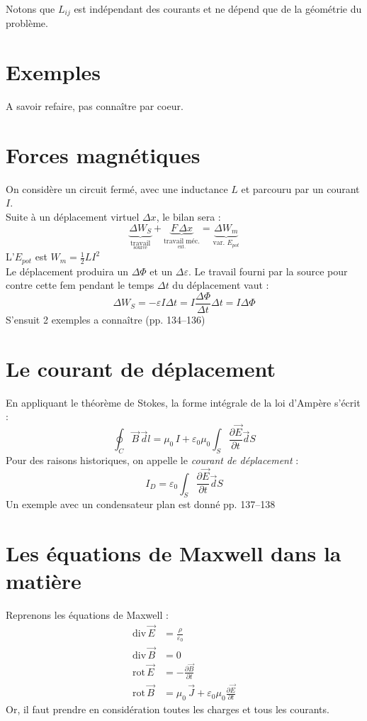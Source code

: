 \documentclass	[11pt, a4paper, openany]{book}
\newcommand{\rot}{\text{rot}\,}
\newcommand{\divv}{\text{div}\,}
\begin{document}
	Notons que $L_{ij}$ est indépendant des courants et ne dépend que de la géométrie du problème. 
	\section{Exemples}
	A savoir refaire, pas connaître par coeur.
	\section{Forces magnétiques}
	On considère un circuit fermé, avec une inductance $L$ et parcouru par un courant $I$.\\Suite à un déplacement virtuel $\Delta x$, le bilan sera : \begin{equation}
	\underbrace{\Delta W_S}_{\underset{\text{source}}{\text{travail}}}+\underbrace{F\,\Delta x}_{\underset{\text{ext.}}{\text{travail méc.}}}=\underbrace{\Delta W_m}_{\text{var. }E_{pot}}
	\end{equation}
	L'$E_{pot}$ est $W_m=\frac{1}{2}LI^2$\\ 
	Le déplacement produira un $\Delta\Phi$ et un $\Delta\varepsilon$. Le travail fourni par la source pour contre cette fem pendant le temps $\Delta t$ du déplacement vaut : \begin{equation}
	\Delta W_S=-\varepsilon I\Delta t=I\frac{\Delta\Phi}{\Delta t}\Delta t=I\Delta\Phi
	\end{equation}
	S'ensuit 2 exemples a connaître (pp. 134--136)
	\section{Le courant de déplacement}
	En appliquant le théorème de Stokes, la forme intégrale de la loi d'Ampère s'écrit :\begin{equation}
	\oint_C\vec B\,\vec dl=\mu_0\,I+\varepsilon_0\mu_0\int_S\frac{\partial\vec E}{\partial t}\vec dS
	\end{equation}
	Pour des raisons historiques, on appelle le \textit{courant de déplacement} :\begin{equation}
	I_D=\varepsilon_0\int_S\frac{\partial\vec E}{\partial t}\vec dS
	\end{equation}
	Un exemple avec un condensateur plan est donné pp. 137--138
	\section{Les équations de Maxwell dans la matière}
	Reprenons les équations de Maxwell : \begin{align}\label{eqmaxwell}
	\divv\vec E & = \frac{\rho}{\varepsilon_0}\\
	\divv\vec B & =0\\
	\rot\vec E & =-\frac{\partial \vec B}{\partial t}\\
	\label{eqampmax}
	\rot\vec B & = \mu_0\,\vec J+\varepsilon_0\mu_0\frac{\partial \vec E}{\partial t}
	\end{align}
	Or, il faut prendre en considération toutes les charges et tous les courants.\\
	
\end{document}
